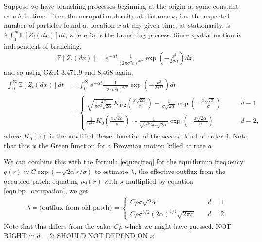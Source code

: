 \documentclass{article}
\newcommand{\E}{\mathbb{E}}
\begin{document}
Suppose we have branching processes beginning at the origin at some constant rate $\lambda$ in time.
Then the occupation density at distance $x$, i.e.\ the expected number of particles found at location $x$ at any given time, at stationarity,
is $\lambda \int_0^\infty \E[Z_t(dx)] dt$, where $Z_t$ is the branching process.
Since spatial motion is independent of branching,
\begin{align}
  \E[Z_t(dx)] = e^{-\alpha t} \frac{1}{(2\pi \sigma^2 t)^{d/2}} \exp\left(-\frac{x^2}{2\sigma^2 t} \right) dx ,
\end{align}
and so using G\&R 3.471.9 and 8.468 again,
\begin{align} \label{eqn:bp_occupation}
  \int_0^\infty \E[Z_t(dx)] dt  &= \int_0^\infty e^{-\alpha t} \frac{1}{(2\pi \sigma^2 t)^{d/2}} \exp\left(-\frac{x^2}{2\sigma^2 t} \right) dt \\
  &= \begin{cases}
    \sqrt{ \frac{ 2 x }{ \pi \sigma^{3} \sqrt{2\alpha} } }  K_{1/2} \left(\frac{x \sqrt{2\alpha}}{\sigma}\right) =
    \frac{1}{\sigma \sqrt{2 \alpha}} \exp\left( - \frac{ x \sqrt{2\alpha} }{ \sigma } \right) \qquad & d=1 \\
    \frac{1}{\sigma^2 \pi} K_0\left(\frac{x \sqrt{2\alpha}}{\sigma}\right) 
    \sim \frac{ 1 }{ \sqrt{ \sigma^3  2\pi x \sqrt{2\alpha} } } \exp\left(-\frac{x\sqrt{2\alpha}}{\sigma}\right) \qquad & d=2  ,
\end{cases} 
\end{align}
where $K_0(z)$ is the modified Bessel function of the second kind of order 0.
Note that this is the Green function for a Brownian motion killed at rate $\alpha$.

We can combine this with the formula \eqref{eqn:eqfreq} for the equilibrium frequency $q(r) \approx C \exp( -\sqrt{2 \alpha} r / \sigma)$
to estimate $\lambda$, the effective outflux from the occupied patch: equating $\rho q(r)$ with $\lambda$ multiplied by equation \eqref{eqn:bp_occupation}, we get
\begin{align} \label{eqn:outflux_from_patch}
    \lambda = \text{(outflux from old patch)} = \begin{cases}
        C \rho \sigma \sqrt{2\alpha} \quad & d=1 \\
    C \rho \sigma^{3/2} (2\alpha)^{1/4} \sqrt{2 \pi x} \quad & d=2 
    \end{cases}
\end{align}
Note that this differs from the value $C\rho$ which we might have guessed.
NOT RIGHT in $d=2$: SHOULD NOT DEPEND ON $x$.
\end{document}
